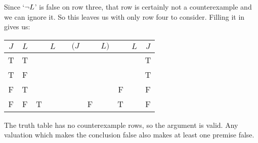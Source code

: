 Since `$\neg L$' is false on row three, that row is certainly not a counterexample and we can ignore it.  So this leaves us with only row four to consider. Filling it in gives us:
\begin{center}
	\begin{tabular}{c c|d e e e e f |d f|c}
		$J$&$L$&\enot&$L$&\eif&$(J$&\eor&$L)$&\enot&$L$&$J$\\
		\hline
		T & T & &&&&&&&& {T}\\
		T & F & &&&&&&&& {T}\\
		F & T & &&&&&&{F}& & {F}\\
		F & F & T &  &  &  & F & & {T} & & {F}
	\end{tabular}
\end{center}
The truth table has no counterexample rows, so the argument is valid. Any valuation which makes the conclusion false also makes at least one premise false.

